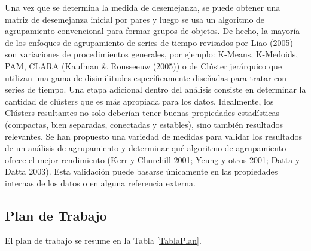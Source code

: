 \documentclass[10pt,a4paper]{article}
\begin{document}
Una vez que se determina la medida de desemejanza, se puede obtener una matriz de desemejanza inicial por pares y luego se usa un algoritmo de agrupamiento convencional para formar grupos de objetos. De hecho, la mayoría de los enfoques de agrupamiento de series de tiempo revisados por Liao (2005) son variaciones de procedimientos generales, por ejemplo: K-Means, K-Medoids, PAM, CLARA (Kaufman \& Rousseeuw (2005)) o de Clúster jerárquico que utilizan una gama de disimilitudes específicamente diseñadas para tratar con series de tiempo. 
Una etapa adicional dentro del análisis consiste en determinar la cantidad de clústers que es más apropiada para los datos. Idealmente, los Clústers resultantes no solo deberían tener buenas propiedades estadísticas (compactas, bien separadas, conectadas y estables), sino también resultados relevantes. Se han propuesto una variedad de medidas para validar los resultados de un análisis de agrupamiento y determinar qué algoritmo de agrupamiento ofrece el mejor rendimiento  (Kerr y Churchill 2001; Yeung y otros 2001; Datta y Datta 2003). Esta validación puede basarse únicamente en las propiedades internas de los datos o en alguna referencia externa.

\subsection{Plan de Trabajo}

El plan de trabajo se resume en la Tabla \ref{TablaPlan}.
\end{document}
